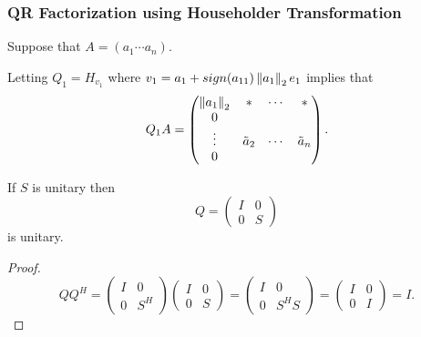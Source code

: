 \documentclass{beamer}
\begin{document}
\begin{frame}\frametitle{QR Factorization using Householder Transformation}
	Suppose that $A = (a_1 \cdots a_n)$.
	
	Letting $Q_1 = H_{v_1}$ where $v_1 = a_1 + sign(a_{11})\left\|a_1 \right\|_2e_1$ implies that
	\[ 
		Q_1A =  
			\begin{pmatrix}
			    \left\|a_1 \right\|_2 & \ast & \cdots & \ast \\
			    0 \\
			    \vdots & \tilde{a}_2 & \cdots & \tilde{a}_n \\
			    0
			 \end{pmatrix}.
	\]
	\begin{lemma}
		If $S$ is unitary then
		\[ 
			Q =  \begin{pmatrix}
					I & 0 \\ 0 & S
				 \end{pmatrix}
		\]
		is unitary.
	\end{lemma}
	\begin{proof}
		\[ 
			QQ^H 
			= \begin{pmatrix} I & 0 \\ 0 &S^H \end{pmatrix}
			  \begin{pmatrix} I & 0 \\ 0 & S \end{pmatrix}
			= \begin{pmatrix} I & 0 \\ 0 & S^H S \end{pmatrix} 
			= \begin{pmatrix} I & 0 \\ 0 & I \end{pmatrix}
			= I.
		\]
	\end{proof}
\end{frame}
\end{document}
